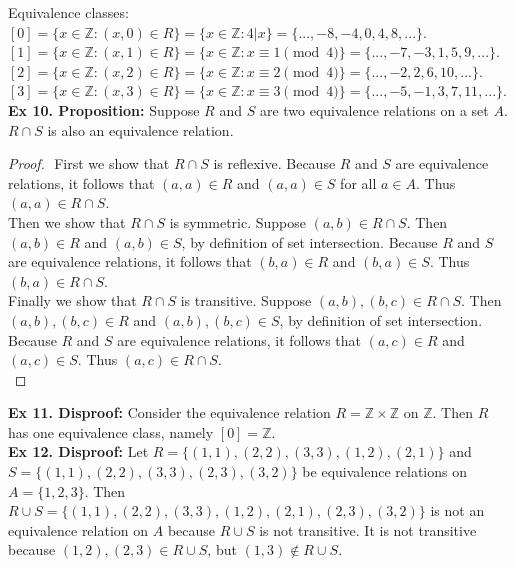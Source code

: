 \documentclass{article}
\begin{document}
\noindent Equivalence classes:\\
$[0] = \{ x \in \mathbb{Z} : (x, 0) \in R \}=\{x \in \mathbb{Z} : 4|x \} = \{...,-8,-4,0,4,8,...\}$.\\
$[1] = \{ x \in \mathbb{Z} : (x, 1) \in R \}=\{x \in \mathbb{Z} : x \equiv 1 \pmod{4} \} = \{...,-7,-3,1,5,9,...\}$.\\
$[2] = \{ x \in \mathbb{Z} : (x, 2) \in R \}=\{x \in \mathbb{Z} : x \equiv 2 \pmod{4} \} = \{...,-2,2,6,10,...\}$.\\
$[3] = \{ x \in \mathbb{Z} : (x, 3) \in R \}=\{x \in \mathbb{Z} : x \equiv 3 \pmod{4} \} = \{...,-5,-1,3,7,11,...\}$.\\

\newpage
\noindent \textbf{Ex 10. Proposition:} Suppose $R$ and $S$ are two equivalence relations on a set $A$. $R \cap S$ is also an equivalence relation.
\begin{proof}
$ $\newline
First we show that $R \cap S$ is reflexive. Because $R$ and $S$ are equivalence relations, it follows that $(a,a) \in R$ and $(a, a) \in S$ for all $a \in A$. Thus $(a,a) \in R \cap S$.\\

\noindent Then we show that $R \cap S$ is symmetric. Suppose $(a, b) \in R \cap S$. Then $(a, b) \in R$ and $(a, b) \in S$, by definition of set intersection. Because $R$ and $S$ are equivalence relations, it follows that $(b,a) \in R$ and $(b, a) \in S$. Thus $(b,a) \in R \cap S$.\\

\noindent Finally we show that $R \cap S$ is transitive. Suppose $(a, b), (b,c) \in R \cap S$. Then $(a, b),(b,c) \in R$ and $(a, b),(b,c) \in S$, by definition of set intersection. Because $R$ and $S$ are equivalence relations, it follows that $(a,c) \in R$ and $(a, c) \in S$. Thus $(a,c) \in R \cap S$.\\
\end{proof}
\noindent \textbf{Ex 11. Disproof:} Consider the equivalence relation $R=\mathbb{Z} \times \mathbb{Z}$ on $\mathbb{Z}$. Then $R$ has one equivalence class, namely $[0]=\mathbb{Z}$.\\

\noindent \textbf{Ex 12. Disproof:} Let $R=\{(1,1), (2,2), (3,3), (1,2), (2,1)\}$ and $S=\{(1,1),(2,2),(3,3),(2,3),(3,2)\}$ be equivalence relations on $A=\{1,2,3\}$. Then $R \cup S = \{(1,1), (2,2), (3,3), (1,2), (2,1), (2,3), (3,2)\}$ is not an equivalence relation on $A$ because $R \cup S$ is not transitive. It is not transitive because $(1,2), (2,3) \in R \cup S$, but $(1,3) \not\in R \cup S$.\\
\end{document}
